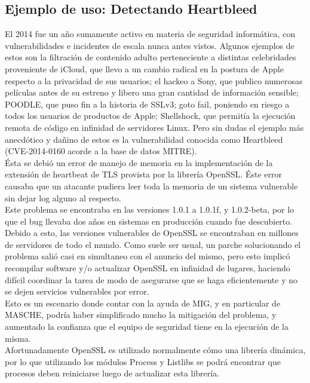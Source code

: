 \subsection{Ejemplo de uso: Detectando Heartbleed}

El 2014 fue un año sumamente activo en materia de seguridad informática, con
vulnerabilidades e incidentes de escala nunca antes vistos. Algunos ejemplos de
estos son la filtración de contenido adulto perteneciente a distintas
celebridades proveniente de iCloud, que llevo a un cambio radical en la postura
de Apple respecto a la privacidad de sus usuarios; el hackeo a Sony, que
publico numerosas películas antes de su estreno y libero una gran cantidad de
información sensible; POODLE, que puso fin a la historia de SSLv3; goto fail,
poniendo en riesgo a todos los usuarios de productos de Apple; Shellshock, que
permitía la ejecución remota de código en infinidad de servidores Linux. Pero
sin dudas el ejemplo más anecdótico y dañino de estos es la vulnerabilidad
conocida como Heartbleed (CVE-2014-0160 acorde a la base de datos MITRE).\\

Ésta se debió un error de manejo de memoria en la implementación de la extensión
de heartbeat de TLS provista por la librería OpenSSL. Éste error causaba que un
atacante pudiera leer toda la memoria de un sistema vulnerable sin dejar log
alguno al respecto.\\

Este problema se encontraba en las versiones 1.0.1 a 1.0.1f, y 1.0.2-beta, por
lo que el bug llevaba dos años en sistemas en producción cuando fue
descubierto. Debido a esto, las versiones vulnerables de OpenSSL se encontraban
en millones de servidores de todo el mundo. Como suele ser usual, un parche
solucionando el problema salió casi en simultaneo con el anuncio del mismo,
pero esto implicó recompilar software y/o actualizar OpenSSL en infinidad de
lugares, haciendo difícil coordinar la tarea de modo de asegurarse que se haga
eficientemente y no se dejen servicios vulnerables por error.\\

Esto es un escenario donde contar con la ayuda de MIG, y en particular de
MASCHE, podría haber simplificado mucho la mitigación del problema, y aumentado
la confianza que el equipo de seguridad tiene en la ejecución de la misma.\\

Afortunadamente OpenSSL es utilizado normalmente cómo una librería dinámica, por
lo que utilizando los módulos Process y Listlibs se podrá encontrar que procesos
deben reiniciarse luego de actualizar esta librería.\\

